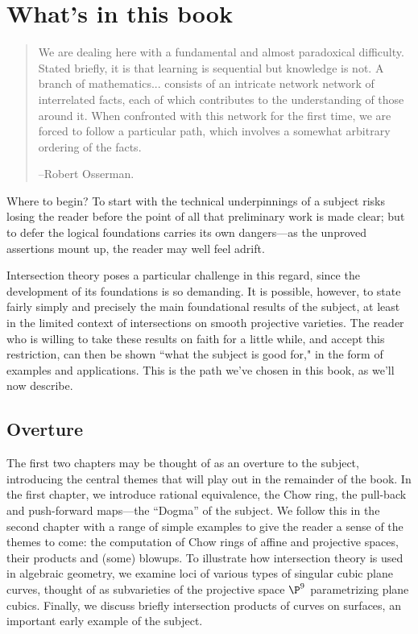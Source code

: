 \section{What's in this book}


\begin{quote}
\small\sf
We are dealing here with a fundamental and almost paradoxical difficulty. Stated briefly, it is that learning is sequential but knowledge is not. A branch of mathematics... consists of an intricate network network of interrelated facts, each of which contributes to the understanding of those around it. When confronted with this network for the first time, we are forced to follow a particular path, which involves a somewhat arbitrary ordering of the facts.

--Robert Osserman.

\end{quote}



Where to begin? To start with the technical underpinnings of a subject risks losing the reader before the point of all that preliminary work is made clear; but to defer the logical foundations carries its own dangers---as the unproved assertions mount up, the reader may well feel adrift.

Intersection theory poses a particular challenge in this regard, since the development of its foundations is so demanding. It is possible, however, to state fairly simply and precisely the main foundational results of the subject, at least in the limited context of intersections on smooth projective varieties. The reader who is willing to take these results on faith for a little while, and accept this restriction, can then be shown ``what the subject is good for," in the form of examples and applications. This is the path we've chosen in this book, as we'll now describe.

\subsection{Overture}

The first two chapters may be thought of as an overture to the subject, introducing the central themes that will play out in the remainder of the book. 
In the first chapter, we introduce rational equivalence, the Chow ring, the pull-back and push-forward maps---the ``Dogma'' of the subject. We follow this in the second chapter with a range of simple examples to give the reader a sense of the themes to come: the computation of Chow rings of affine and projective spaces, their products and (some) blowups. To illustrate how intersection theory is used in algebraic geometry, we examine loci of various types of singular cubic plane curves, thought of as subvarieties of the projective space
$\P^9$ parametrizing plane cubics. Finally, we discuss briefly intersection products of curves on surfaces, an important early example of the subject.

